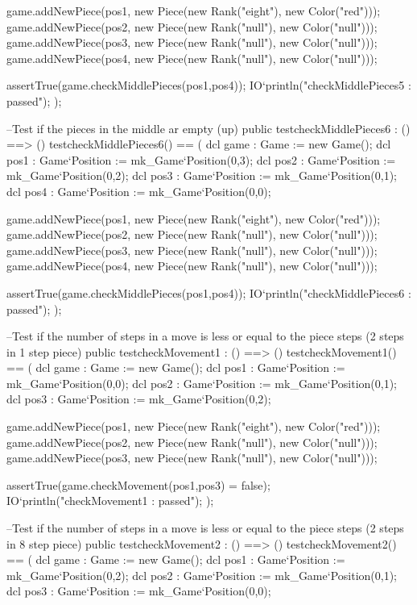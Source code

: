 \begin{vdm_al}
    game.addNewPiece(pos1, new Piece(new Rank("eight"), new Color("red")));
    game.addNewPiece(pos2, new Piece(new Rank("null"), new Color("null")));
    game.addNewPiece(pos3, new Piece(new Rank("null"), new Color("null")));
    game.addNewPiece(pos4, new Piece(new Rank("null"), new Color("null")));
    
    assertTrue(game.checkMiddlePieces(pos1,pos4));
    IO`println("checkMiddlePieces5 : passed");
   );
   
  --Test if the pieces in the middle ar empty (up)
  public testcheckMiddlePieces6 : () ==> ()
   testcheckMiddlePieces6() ==
   (
    dcl game : Game := new Game();
    dcl pos1 : Game`Position := mk_Game`Position(0,3);
    dcl pos2 : Game`Position := mk_Game`Position(0,2);
    dcl pos3 : Game`Position := mk_Game`Position(0,1);
    dcl pos4 : Game`Position := mk_Game`Position(0,0);
    
    game.addNewPiece(pos1, new Piece(new Rank("eight"), new Color("red")));
    game.addNewPiece(pos2, new Piece(new Rank("null"), new Color("null")));
    game.addNewPiece(pos3, new Piece(new Rank("null"), new Color("null")));
    game.addNewPiece(pos4, new Piece(new Rank("null"), new Color("null")));
    
    assertTrue(game.checkMiddlePieces(pos1,pos4));
    IO`println("checkMiddlePieces6 : passed");
   );
  
  --Test if the number of steps in a move is less or equal to the piece steps (2 steps in 1 step piece)
  public testcheckMovement1 : () ==> ()
   testcheckMovement1() ==
   (
    dcl game : Game := new Game();
    dcl pos1 : Game`Position := mk_Game`Position(0,0);
    dcl pos2 : Game`Position := mk_Game`Position(0,1);
    dcl pos3 : Game`Position := mk_Game`Position(0,2);
    
    game.addNewPiece(pos1, new Piece(new Rank("eight"), new Color("red")));
    game.addNewPiece(pos2, new Piece(new Rank("null"), new Color("null")));
    game.addNewPiece(pos3, new Piece(new Rank("null"), new Color("null")));
    
    assertTrue(game.checkMovement(pos1,pos3) = false);
    IO`println("checkMovement1 : passed");
   );
  
  
  --Test if the number of steps in a move is less or equal to the piece steps (2 steps in 8 step piece)
  public testcheckMovement2 : () ==> ()
   testcheckMovement2() ==
   (
    dcl game : Game := new Game();
    dcl pos1 : Game`Position := mk_Game`Position(0,2);
    dcl pos2 : Game`Position := mk_Game`Position(0,1);
    dcl pos3 : Game`Position := mk_Game`Position(0,0);
    

\end{vdm_al}
